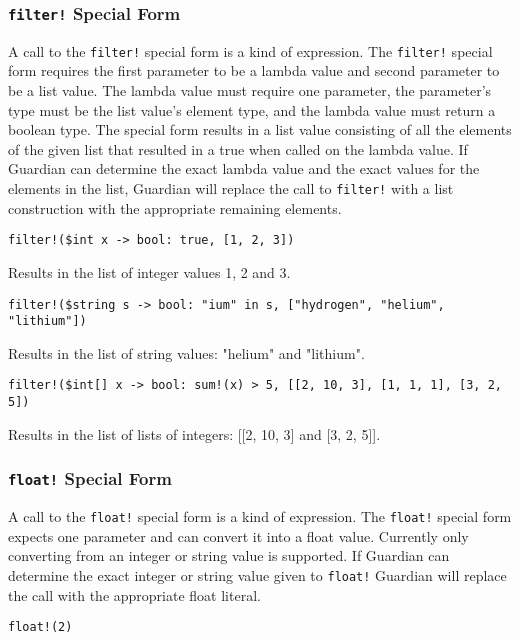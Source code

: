 {	\subsubsection{\texttt{filter!} Special Form}
	{
		A call to the \texttt{filter!} special form is a kind of expression.
		The \texttt{filter!} special form requires the first parameter to be
		a lambda value and second parameter to be a list value.
		The lambda value must require one parameter, the parameter's type must
		be the list value's element type, and the lambda value must return a
		boolean type.
		The special form results in a list value consisting of all the elements
		of the given list that resulted in a true when called on the lambda
		value.
		If Guardian can determine the exact lambda value and the exact
		values for the elements in the list, Guardian will replace the call
		to \texttt{filter!} with a list construction with the appropriate
		remaining elements.
		
		\begin{itemize}
		{
			\item \texttt{filter!(\$int x -> bool: true, [1, 2, 3])}
			
				Results in the list of integer values 1, 2 and 3.
			
			\item \texttt{filter!(\$string s -> bool: "ium" in s, ["hydrogen", "helium", "lithium"])}
			
				Results in the list of string values: "helium" and "lithium".
			
			\item \texttt{filter!(\$int[] x -> bool: sum!(x) > 5, [[2, 10, 3], [1, 1, 1], [3, 2, 5])}
				
				Results in the list of lists of integers: [[2, 10, 3] and [3, 2, 5]].
		}
		\end{itemize}
	}
	
	\subsubsection{\texttt{float!} Special Form}
	{
		A call to the \texttt{float!} special form is a kind of expression.
		The \texttt{float!} special form expects one parameter and can convert it
		into a float value. Currently only converting from an integer or string
		value is supported.
		If Guardian can determine the exact integer or string value given to
		\texttt{float!} Guardian will replace the call with the appropriate
		float literal.
		
		\begin{itemize}
		{
			\item \texttt{float!(2)}
			
}
\end{itemize}}}
